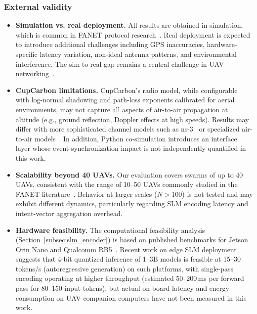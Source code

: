 \documentclass[5p,times]{elsarticle}
\begin{document}
\subsubsection{External validity}

\begin{itemize}
\item \textbf{Simulation vs. real deployment.} All results are obtained in simulation, which is common in FANET protocol research~\cite{bekmezci2013fanets,khan2020routing,lakew2020routing}. Real deployment is expected to introduce additional challenges including GPS inaccuracies, hardware-specific latency variation, non-ideal antenna patterns, and environmental interference. The sim-to-real gap remains a central challenge in UAV networking~\cite{gupta2015survey_uav_simulation,hentati2020comprehensive_survey}.

\item \textbf{CupCarbon limitations.} CupCarbon's radio model, while configurable with log-normal shadowing and path-loss exponents calibrated for aerial environments, may not capture all aspects of air-to-air propagation at altitude (e.g., ground reflection, Doppler effects at high speeds). Results may differ with more sophisticated channel models such as ns-3~\cite{gawlowicz2019ns3gym} or specialized air-to-air models~\cite{khuwaja2018a2a_survey}. In addition, Python co-simulation introduces an interface layer whose event-synchronization impact is not independently quantified in this work.

\item \textbf{Scalability beyond 40 UAVs.} Our evaluation covers swarms of up to 40 UAVs, consistent with the range of 10--50 UAVs commonly studied in the FANET literature~\cite{oubbati2019routing,lakew2020routing}. Behavior at larger scales ($N > 100$) is not tested and may exhibit different dynamics, particularly regarding SLM encoding latency and intent-vector aggregation overhead.

\item \textbf{Hardware feasibility.} The computational feasibility analysis (Section~\ref{subsec:slm_encoder}) is based on published benchmarks for Jetson Orin Nano and Qualcomm RB5~\cite{abdin2024phi3,mittal2024survey_edge_llm}. Recent work on edge SLM deployment~\cite{xu2024survey_slm,lin2024awq} suggests that 4-bit quantized inference of 1--3B models is feasible at 15--30 tokens/s (autoregressive generation) on such platforms, with single-pass encoding operating at higher throughput (estimated 50--200\,ms per forward pass for 80--150 input tokens), but actual on-board latency and energy consumption on UAV companion computers have not been measured in this work.
\end{itemize}
\end{document}
